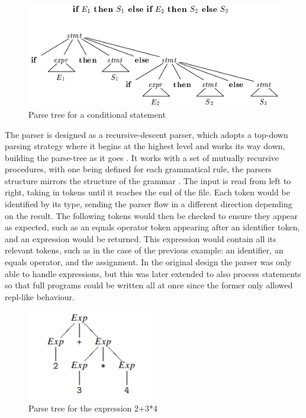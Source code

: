 \documentclass[
]{report}
\begin{document}
\begin{figure}
	\centering
	\includegraphics[width=\textwidth]{parse-tree}
	\caption{Parse tree for a conditional statement \cite{dragon-book}}
	\label{fig:parse-tree}
\end{figure}

The parser is designed as a \gls{recursive-descent parser}, which adopts a
top-down \gls{parsing} strategy where it begins at the highest level and works
its way down, building the \gls{parse-tree} as it goes \cite{geeks-website}.
It works with a set of mutually recursive procedures, with one being defined
for each grammatical rule, the parsers structure mirrors the structure of
the grammar \cite{parsing-algorithms}. The input is read from left to right,
taking in \glspl{token} until it reaches the end of the file. Each \gls{token}
would be identified by its type, sending the parser flow in a different direction
depending on the result. The following \glspl{token} would then be checked to
ensure they appear as expected, such as an equals operator \gls{token} appearing
after an \gls{identifier} \gls{token}, and an \gls{expression} would be returned.
This \gls{expression} would contain all its relevant \glspl{token}, such as in
the case of the previous example: an \gls{identifier}, an equals operator, and
the assignment. In the original design the parser was only able to handle \glspl{expression},
but this was later extended to also process \glspl{statement} so that full programs could be
written all at once since the former only allowed \acrshort{repl}-like behaviour.

\begin{figure}
	\centering
	\includegraphics[width=0.5\textwidth]{operator-precedence}
	\caption{Parse tree for the expression 2+3*4 \cite{compiler-design-book}}
	\label{fig:operator-precedence}
\end{figure}
\end{document}
